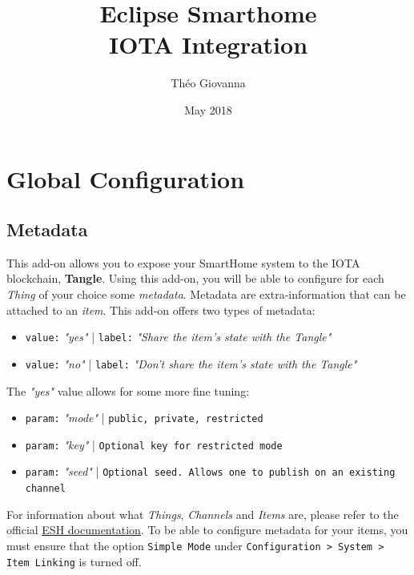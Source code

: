 \documentclass[a4paper,10pt]{article}
\title{Eclipse Smarthome \\ IOTA Integration}
\author{Théo Giovanna}
\date{May 2018}
\begin{document}
\maketitle

\section{Global Configuration}

\subsection{Metadata}

This add-on allows you to expose your SmartHome system to the IOTA blockchain, \textbf{Tangle}.
Using this add-on, you will be able to configure for each \textit{Thing} of your choice some \textit{metadata}. Metadata are extra-information that can be attached to an \textit{item}. This add-on offers two types of metadata: \\

\begin{itemize}
	\item \texttt{value:} \textit{"yes"} | \texttt{label:} \textit{"Share the item's state with the Tangle"}
	\item \texttt{value:} \textit{"no"} | \texttt{label:} \textit{"Don't share the item's state with the Tangle"}
\end{itemize} 

\noindent The \textit{"yes"} value allows for some more fine tuning:

\begin{itemize}
	\item \texttt{param:} \textit{"mode"} | \texttt{public, private, restricted}
	\item \texttt{param:} \textit{"key"} | \texttt{Optional key for restricted mode}
	\item \texttt{param:} \textit{"seed"} | \texttt{Optional seed. Allows one to publish on an existing channel}
\end{itemize}

\bigskip

\noindent For information about what \textit{Things}, \textit{Channels} and \textit{Items} are, please refer to the official \textcolor{blue}{\underline{\href{https://www.eclipse.org/smarthome/documentation/index.html}{ESH documentation}}}. To be able to configure metadata for your items, you must ensure that the option \texttt{Simple Mode} under \texttt{Configuration > System > Item Linking} is turned off.
\end{document}
